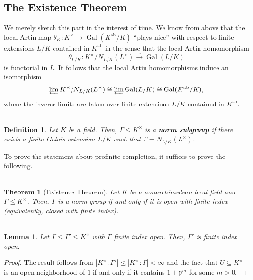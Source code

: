 \documentclass[11pt]{article}
\newcommand{\iso}{\cong}
\newcommand{\mf}[1]{\mathfrak{#1}}
\newcommand{\xto}[1]{\xrightarrow{#1}}
\DeclareMathOperator{\ab}{ab} %
\DeclareMathOperator{\Gal}{Gal}
\renewcommand{\subset}{\subseteq}
\newcommand{\flim}{\varprojlim}
\newtheorem*{definition*}{\\Definition}
\newtheorem*{lemma*}{\\Lemma}
\newtheorem*{theorem*}{\\Theorem}
\begin{document}
\subsection{The Existence Theorem}
We merely sketch this part in the interest of time. We know from above that the local Artin map $\theta_K: K^{\times}\to\Gal(K^{\ab}/K)$ ``plays nice'' with respect to finite extensions $L/K$ contained in $K^{\ab}$ in the sense that the local Artin homomorphism 
$$\theta_{L/K}: K^{\times}/N_{L/K}(L^{\times})\xto{\sim}\Gal(L/K)$$ 
is functorial in $L$. It follows that the local Artin homomorphisms induce an isomorphism
$$\flim K^{\times}/N_{L/K}(L^{\times})\iso\flim\Gal(L/K)\iso\Gal(K^{\ab}/K),$$
where the inverse limits are taken over finite extensions $L/K$ contained in $K^{\ab}$. 

\begin{definition*}
Let $K$ be a field. Then, $\Gamma\leq K^{\times}$ is a \textbf{norm subgroup} if there exists a finite Galois extension $L/K$ such that $\Gamma=N_{L/K}(L^{\times})$.
\end{definition*}

To prove the statement about profinite completion, it suffices to prove the following.

\begin{theorem*}[Existence Theorem]
Let $K$ be a nonarchimedean local field and $\Gamma\leq K^{\times}$. Then, $\Gamma$ is a norm group if and only if it is open with finite index (equivalently, closed with finite index).
\end{theorem*}

\begin{lemma*}
Let $\Gamma\leq\Gamma'\leq K^{\times}$ with $\Gamma$ finite index open. Then, $\Gamma'$ is finite index open.
\end{lemma*}
\begin{proof}
The result follows from $|K^{\times}:\Gamma'|\leq|K^{\times}:\Gamma|<\infty$ and the fact that $U\subset K^{\times}$ is an open neighborhood of $1$ if and only if it contains $1+\mf{p}^m$ for some $m>0$.
\end{proof}
\end{document}

